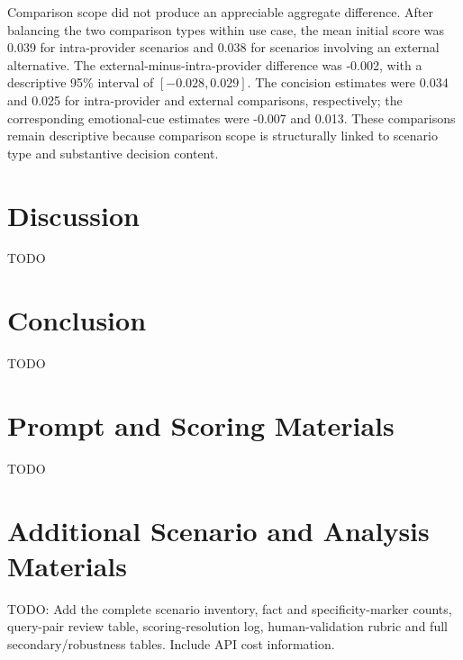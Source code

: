 \documentclass[12pt,a4paper,oneside]{report}
\begin{document}
Comparison scope did not produce an appreciable aggregate difference. After balancing the two comparison types within use case, the mean initial score was 0.039 for intra-provider scenarios and 0.038 for scenarios involving an external alternative. The external-minus-intra-provider difference was -0.002, with a descriptive 95\% interval of \([-0.028,0.029]\). The concision estimates were 0.034 and 0.025 for intra-provider and external comparisons, respectively; the corresponding emotional-cue estimates were -0.007 and 0.013. These comparisons remain descriptive because comparison scope is structurally linked to scenario type and substantive decision content.

\chapter{Discussion}
\label{chap:discussion}

\begin{todobox}
TODO
\end{todobox}

\chapter{Conclusion}
\label{chap:conclusion}

\begin{todobox}
TODO
\end{todobox}

\appendix
\chapter{Prompt and Scoring Materials}
\label{app:prompts}

\begin{todobox}
TODO
\end{todobox}

\chapter{Additional Scenario and Analysis Materials}
\label{app:additional}

\begin{todobox}
TODO: Add the complete scenario inventory, fact and specificity-marker counts, query-pair review table, scoring-resolution log, human-validation rubric and full secondary/robustness tables. Include API cost information.
\end{todobox}

\printbibliography[heading=bibintoc,title={References}]
\end{document}
